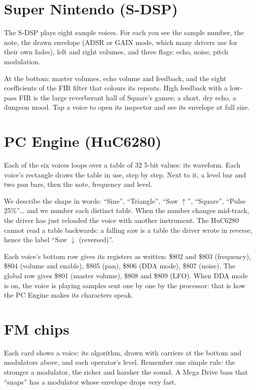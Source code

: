 \section{Super Nintendo (S-DSP)}
The S-DSP plays eight sample voices. For each you see the sample number, the note, the drawn envelope (ADSR or GAIN
mode, which many drivers use for their own fades), left and right volumes, and three flags: echo, noise, pitch
modulation.

At the bottom: master volumes, echo volume and feedback, and the eight coefficients of the FIR filter that colours
its repeats. High feedback with a low-pass FIR is the large reverberant hall of Square's games; a short, dry echo, a
dungeon mood. Tap a voice to open its inspector and see its envelope at full size.

\section{PC Engine (HuC6280)}
Each of the six voices loops over a table of 32 5-bit values: its waveform. Each voice's rectangle draws the table in
use, step by step. Next to it, a level bar and two pan bars, then the note, frequency and level.

We describe the shape in words: ``Sine'', ``Triangle'', ``Saw $\uparrow$'', ``Square'', ``Pulse 25\%''\dots{} and
we number each distinct table. When the number changes mid-track, the driver has just reloaded the voice with another
instrument. The HuC6280 cannot read a table backwards: a falling saw is a table the driver wrote in reverse, hence
the label ``Saw $\downarrow$ (reversed)''.

Each voice's bottom row gives its registers as written: \$802 and \$803 (frequency), \$804 (volume and enable),
\$805 (pan), \$806 (DDA mode), \$807 (noise). The global row gives \$801 (master volume), \$808 and \$809 (LFO). When
DDA mode is on, the voice is playing samples sent one by one by the processor: that is how the PC Engine makes its
characters speak.

\section{FM chips}
Each card shows a voice: its algorithm, drawn with carriers at the bottom and modulators above, and each operator's
level. Remember one simple rule: the stronger a modulator, the richer and harsher the sound. A Mega Drive bass that
``snaps'' has a modulator whose envelope drops very fast.

